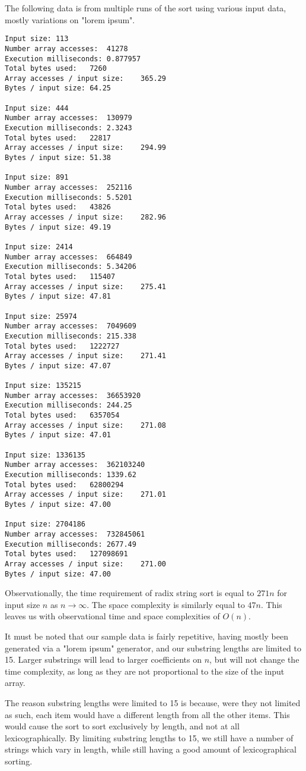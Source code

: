 \documentclass[12pt]{amsart}
\begin{document}
    The following data is from multiple runs of the sort using
    various input data, mostly variations on "lorem ipsum".

    \newpage

\begin{verbatim}
Input size:	113
Number array accesses:	41278
Execution milliseconds:	0.877957
Total bytes used:	7260
Array accesses / input size:    365.29
Bytes / input size: 64.25

Input size:	444
Number array accesses:	130979
Execution milliseconds:	2.3243
Total bytes used:	22817
Array accesses / input size:    294.99
Bytes / input size: 51.38

Input size:	891
Number array accesses:	252116
Execution milliseconds:	5.5201
Total bytes used:	43826
Array accesses / input size:    282.96
Bytes / input size: 49.19

Input size:	2414
Number array accesses:	664849
Execution milliseconds:	5.34206
Total bytes used:	115407
Array accesses / input size:    275.41
Bytes / input size: 47.81

Input size:	25974
Number array accesses:	7049609
Execution milliseconds:	215.338
Total bytes used:	1222727
Array accesses / input size:    271.41
Bytes / input size: 47.07

Input size:	135215
Number array accesses:	36653920
Execution milliseconds:	244.25
Total bytes used:	6357054
Array accesses / input size:    271.08
Bytes / input size: 47.01

Input size:	1336135
Number array accesses:	362103240
Execution milliseconds:	1339.62
Total bytes used:	62800294
Array accesses / input size:    271.01
Bytes / input size: 47.00

Input size:	2704186
Number array accesses:	732845061
Execution milliseconds:	2677.49
Total bytes used:	127098691
Array accesses / input size:    271.00
Bytes / input size: 47.00

\end{verbatim}

    Observationally, the time requirement of radix string sort
    is equal to $271n$ for input size $n$ as $n \to \infty$. The
    space complexity is similarly equal to $47n$. This leaves
    us with observational time and space complexities of $O(n)$.

    It must be noted that our sample data is fairly repetitive,
    having mostly been generated via a "lorem ipsum" generator,
    and our substring lengths are limited to 15. Larger
    substrings will lead to larger coefficients on $n$, but will
    not change the time complexity, as long as they are not
    proportional to the size of the input array.

    The reason substring lengths were limited to 15 is because,
    were they not limited as such, each item would have a
    different length from all the other items. This would cause
    the sort to sort exclusively by length, and not at all
    lexicographically. By limiting substring lengths to 15, we
    still have a number of strings which vary in length, while
    still having a good amount of lexicographical sorting.
\end{document}
